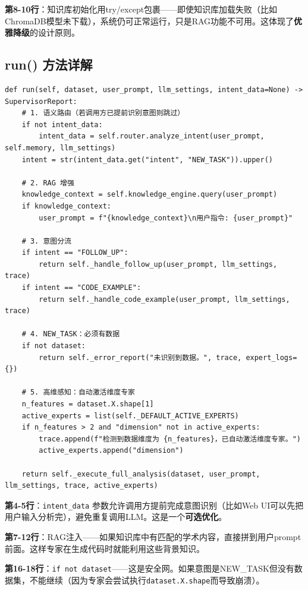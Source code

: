 \documentclass[11pt,a4paper]{ctexbook}
\begin{document}
\textbf{第8-10行}：知识库初始化用try/except包裹——即使知识库加载失败（比如ChromaDB模型未下载），系统仍可正常运行，只是RAG功能不可用。这体现了\textbf{优雅降级}的设计原则。

\subsection{run() 方法详解}

\begin{verbatim}
def run(self, dataset, user_prompt, llm_settings, intent_data=None) -> SupervisorReport:
    # 1. 语义路由（若调用方已提前识别意图则跳过）
    if not intent_data:
        intent_data = self.router.analyze_intent(user_prompt, self.memory, llm_settings)
    intent = str(intent_data.get("intent", "NEW_TASK")).upper()

    # 2. RAG 增强
    knowledge_context = self.knowledge_engine.query(user_prompt)
    if knowledge_context:
        user_prompt = f"{knowledge_context}\n用户指令: {user_prompt}"

    # 3. 意图分流
    if intent == "FOLLOW_UP":
        return self._handle_follow_up(user_prompt, llm_settings, trace)
    if intent == "CODE_EXAMPLE":
        return self._handle_code_example(user_prompt, llm_settings, trace)

    # 4. NEW_TASK：必须有数据
    if not dataset:
        return self._error_report("未识别到数据。", trace, expert_logs={})

    # 5. 高维感知：自动激活维度专家
    n_features = dataset.X.shape[1]
    active_experts = list(self._DEFAULT_ACTIVE_EXPERTS)
    if n_features > 2 and "dimension" not in active_experts:
        trace.append(f"检测到数据维度为 {n_features}，已自动激活维度专家。")
        active_experts.append("dimension")

    return self._execute_full_analysis(dataset, user_prompt, llm_settings, trace, active_experts)
\end{verbatim}

\textbf{第4-5行}：\verb|intent_data| 参数允许调用方提前完成意图识别（比如Web UI可以先把用户输入分析完），避免重复调用LLM。这是一个\textbf{可选优化}。

\textbf{第7-12行}：RAG注入——如果知识库中有匹配的学术内容，直接拼到用户prompt前面。这样专家在生成代码时就能利用这些背景知识。

\textbf{第16-18行}：\verb|if not dataset|——这是安全网。如果意图是NEW\_TASK但没有数据集，不能继续（因为专家会尝试执行\verb|dataset.X.shape|而导致崩溃）。
\end{document}
